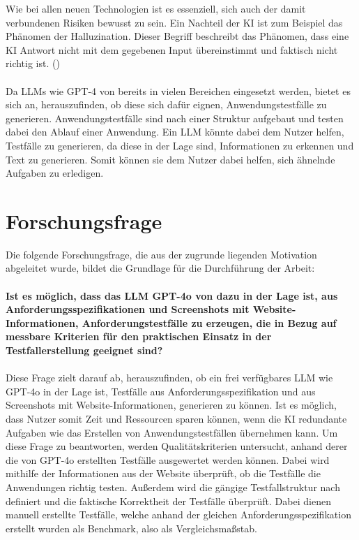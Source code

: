 \documentclass[12pt,toc=bib,toc=listof]{scrreprt}
\begin{document}
\noindent Wie bei allen neuen Technologien ist es essenziell, sich auch der damit verbundenen Risiken bewusst zu sein. Ein Nachteil der KI ist zum Beispiel das Phänomen der Halluzination. Dieser Begriff beschreibt das Phänomen, dass eine KI Antwort nicht mit dem gegebenen Input übereinstimmt und faktisch nicht richtig ist. (\cite{Siebert2024})\\
\\
Da LLMs wie GPT-4 von \textcite{OpenAI2025} bereits in vielen Bereichen eingesetzt werden, bietet es sich an, herauszufinden, ob diese sich dafür eignen, Anwendungstestfälle zu generieren. Anwendungstestfälle sind nach einer Struktur aufgebaut und testen dabei den Ablauf einer Anwendung. Ein LLM könnte dabei dem Nutzer helfen, Testfälle zu generieren, da diese in der Lage sind, Informationen zu erkennen und Text zu generieren. Somit können sie dem Nutzer dabei helfen, sich ähnelnde Aufgaben zu erledigen.

\section{Forschungsfrage} %
\label{sec:forschungsfrage}
Die folgende Forschungsfrage, die aus der zugrunde liegenden Motivation abgeleitet wurde, bildet die Grundlage für die Durchführung der Arbeit:\\
\\
\textbf{Ist es möglich, dass das LLM GPT-4o von \textcite{OpenAI2025} dazu in der Lage ist, aus Anforderungsspezifikationen und Screenshots mit Website-Informationen, Anforderungstestfälle zu erzeugen, die in Bezug auf messbare Kriterien für den praktischen Einsatz in der Testfallerstellung geeignet sind?}\\
\\
Diese Frage zielt darauf ab, herauszufinden, ob ein frei verfügbares LLM wie GPT-4o in der Lage ist, Testfälle aus Anforderungsspezifikation und aus Screenshots mit Website-Informationen, generieren zu können. Ist es möglich, dass Nutzer somit Zeit und Ressourcen sparen können, wenn die KI redundante Aufgaben wie das Erstellen von Anwendungstestfällen übernehmen kann. Um diese Frage zu beantworten, werden Qualitätskriterien untersucht, anhand derer die von GPT-4o erstellten Testfälle ausgewertet werden können. Dabei wird mithilfe der Informationen aus der Website überprüft, ob die Testfälle die Anwendungen richtig testen. Außerdem wird die gängige Testfallstruktur nach \textcite{IsoIecIeee2024} definiert und die faktische Korrektheit der Testfälle überprüft. Dabei dienen manuell erstellte Testfälle, welche anhand der gleichen Anforderungsspezifikation erstellt wurden als Benchmark, also als Vergleichsmaßstab.
\end{document}
